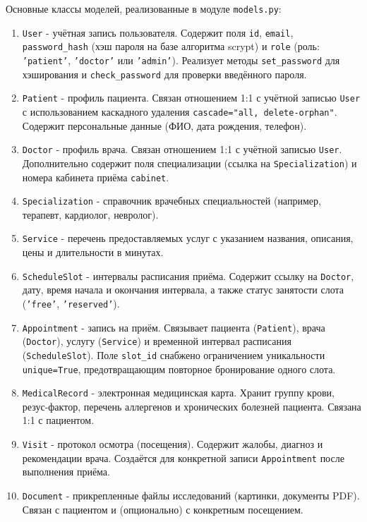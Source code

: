 Основные классы моделей, реализованные в модуле \texttt{models.py}:
\begin{enumerate}
    \item \texttt{User} - учётная запись пользователя. Содержит поля \texttt{id}, \texttt{email}, \texttt{password\_hash} (хэш пароля на базе алгоритма scrypt) и \texttt{role} (роль: \texttt{'patient'}, \texttt{'doctor'} или \texttt{'admin'}). Реализует методы \texttt{set\_password} для хэширования и \texttt{check\_password} для проверки введённого пароля.
    \item \texttt{Patient} - профиль пациента. Связан отношением 1:1 с учётной записью \texttt{User} с использованием каскадного удаления \texttt{cascade="all, delete-orphan"}. Содержит персональные данные (ФИО, дата рождения, телефон).
    \item \texttt{Doctor} - профиль врача. Связан отношением 1:1 с учётной записью \texttt{User}. Дополнительно содержит поля специализации (ссылка на \texttt{Specialization}) и номера кабинета приёма \texttt{cabinet}.
    \item \texttt{Specialization} - справочник врачебных специальностей (например, терапевт, кардиолог, невролог).
    \item \texttt{Service} - перечень предоставляемых услуг с указанием названия, описания, цены и длительности в минутах.
    \item \texttt{ScheduleSlot} - интервалы расписания приёма. Содержит ссылку на \texttt{Doctor}, дату, время начала и окончания интервала, а также статус занятости слота (\texttt{'free'}, \texttt{'reserved'}).
    \item \texttt{Appointment} - запись на приём. Связывает пациента (\texttt{Patient}), врача (\texttt{Doctor}), услугу (\texttt{Service}) и временной интервал расписания (\texttt{ScheduleSlot}). Поле \texttt{slot\_id} снабжено ограничением уникальности \texttt{unique=True}, предотвращающим повторное бронирование одного слота.
    \item \texttt{MedicalRecord} - электронная медицинская карта. Хранит группу крови, резус-фактор, перечень аллергенов и хронических болезней пациента. Связана 1:1 с пациентом.
    \item \texttt{Visit} - протокол осмотра (посещения). Содержит жалобы, диагноз и рекомендации врача. Создаётся для конкретной записи \texttt{Appointment} после выполнения приёма.
    \item \texttt{Document} - прикрепленные файлы исследований (картинки, документы PDF). Связан с пациентом и (опционально) с конкретным посещением.
\end{enumerate}

